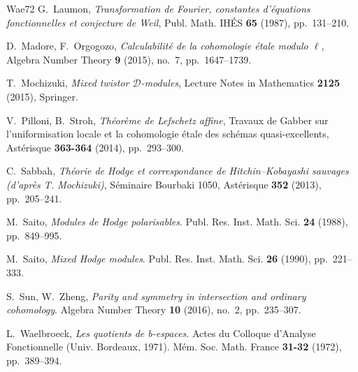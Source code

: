\documentclass[12pt,oneside]{amsbook}
\theoremstyle{plain}
\theoremstyle{definition}
\begin{document}
\begin{thebibliography}{Wae72}
 G.~Laumon, \emph{Transformation de Fourier, constantes d'équations fonctionnelles et conjecture de Weil}, Publ. Math. IHÉS \textbf{65} (1987), pp.~131--210.

 D.~Madore, F.~Orgogozo, \emph{Calculabilité de la cohomologie étale modulo $\ell$}, Algebra Number Theory \textbf{9} (2015), no.~7, pp.~1647--1739.

 T.~Mochizuki, \emph{Mixed twistor $\mathcal{D}$-modules}, Lecture Notes in Mathematics \textbf{2125} (2015), Springer.

 V.~Pilloni, B.~Stroh, \emph{Théorème de Lefschetz affine}, Travaux de Gabber sur l'uniformisation locale et la cohomologie étale des schémas quasi-excellents, Astérisque \textbf{363-364} (2014), pp.~293--300.

 C.~Sabbah, \emph{Théorie de Hodge et correspondance de Hitchin--Kobayashi sauvages (d'après T. Mochizuki)}, Séminaire Bourbaki 1050, Astérisque \textbf{352} (2013), pp.~205--241.

 M.~Saito, \emph{Modules de Hodge polarisables}. Publ. Res. Inst. Math. Sci. \textbf{24} (1988), pp.~849--995.

 M.~Saito, \emph{Mixed Hodge modules}. Publ. Res. Inst. Math. Sci. \textbf{26} (1990), pp.~221--333.

 S.~Sun, W.~Zheng, \emph{Parity and symmetry in intersection and ordinary cohomology}. Algebra Number Theory \textbf{10} (2016), no.~2, pp.~235--307.

 L.~Waelbroeck, \emph{Les quotients de b-espaces}. Actes du Colloque d'Analyse Fonctionnelle (Univ. Bordeaux, 1971). Mém. Soc. Math. France \textbf{31-32} (1972), pp.~389--394.
\end{thebibliography}
\end{document}
